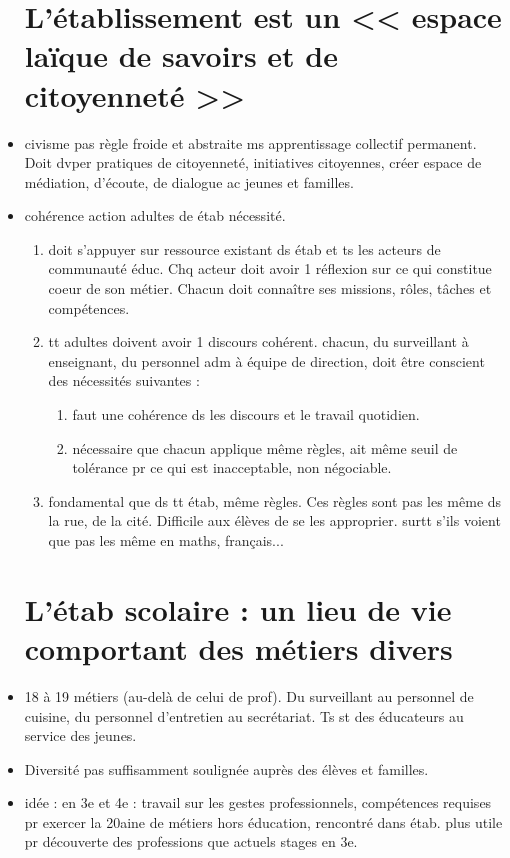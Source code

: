 \documentclass[12pt]{report}
\begin{document}
\begin{itemize}
 \section{L'établissement est un << espace laïque de savoirs et de citoyenneté >>}
 
 \item civisme pas règle froide et abstraite ms apprentissage collectif permanent. Doit dvper pratiques de citoyenneté, initiatives citoyennes, créer espace de médiation, d'écoute, de dialogue ac jeunes et familles. \\
 
 \item cohérence action adultes de étab nécessité. 
 \begin{enumerate}
 \item doit s'appuyer sur ressource existant ds étab et ts les acteurs de communauté éduc. Chq acteur doit avoir 1 réflexion sur ce qui constitue coeur de son métier. Chacun doit connaître ses missions, rôles, tâches et compétences. \\
 \item tt adultes doivent avoir 1 discours cohérent. chacun, du surveillant à enseignant, du personnel adm à équipe de direction, doit être conscient des nécessités suivantes : 
 \begin{enumerate}
 \item faut une cohérence ds les discours et le travail quotidien. \\
 \item nécessaire que chacun applique même règles, ait même seuil de tolérance pr ce qui est inacceptable, non négociable. \\
 \end{enumerate}
 
 \item  fondamental que ds tt étab, même règles. Ces règles sont pas les même ds la rue, de la cité. Difficile aux élèves de se les approprier. surtt s'ils voient que pas les même en maths, français...
 \end{enumerate}
 
 \section{L'étab scolaire : un lieu de vie comportant des métiers divers}


\item 18 à 19 métiers (au-delà de celui de prof). Du surveillant au personnel de cuisine, du personnel d'entretien au secrétariat. Ts st des éducateurs au service des jeunes. \\
\item Diversité pas suffisamment  soulignée auprès des  élèves et familles. \\
\item idée : en 3e et 4e : travail sur les gestes professionnels, compétences requises pr exercer la 20aine de métiers hors éducation, rencontré dans étab. plus utile pr découverte des professions que actuels stages en 3e.



\end{itemize}
\end{document}
